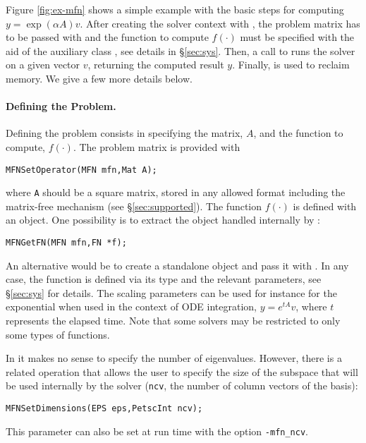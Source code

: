 Figure \ref{fig:ex-mfn} shows a simple example with the basic steps for computing $y=\exp(\alpha A)v$. After creating the solver context with , the problem matrix has to be passed with  and the function to compute $f(\cdot)$ must be specified with the aid of the auxiliary class , see details in \S\ref{sec:sys}. Then, a call to  runs the solver on a given vector $v$, returning the computed result $y$. Finally,  is used to reclaim memory. We give a few more details below.

\paragraph{Defining the Problem.}

Defining the problem consists in specifying the matrix, $A$, and the function to compute, $f(\cdot)$. The problem matrix is provided with
        \begin{Verbatim}[fontsize=\small]
        MFNSetOperator(MFN mfn,Mat A);
        \end{Verbatim}
where \texttt{A} should be a square matrix, stored in any allowed \petsc format including the matrix-free mechanism (see \S\ref{sec:supported}). The function $f(\cdot)$ is defined with an  object. One possibility is to extract the  object handled internally by :
        \begin{Verbatim}[fontsize=\small]
        MFNGetFN(MFN mfn,FN *f);
        \end{Verbatim}
An alternative would be to create a standalone  object and pass it with . In any case, the function is defined via its type and the relevant parameters, see \S\ref{sec:sys} for details. The scaling parameters can be used for instance for the exponential when used in the context of ODE integration, $y=e^{tA}v$, where $t$ represents the elapsed time. Note that some  solvers may be restricted to only some types of  functions.

In  it makes no sense to specify the number of eigenvalues. However, there is a related operation that allows the user to specify the size of the subspace that will be used internally by the solver (\texttt{ncv}, the number of column vectors of the basis):
        \begin{Verbatim}[fontsize=\small]
        MFNSetDimensions(EPS eps,PetscInt ncv);
        \end{Verbatim}
This parameter can also be set at run time with the option \Verb!-mfn_ncv!.

